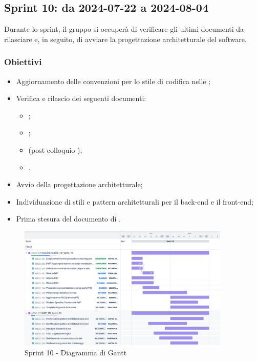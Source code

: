 \subsection{Sprint 10: da 2024-07-22 a 2024-08-04}
\par Durante lo sprint, il gruppo si occuperà di verificare gli ultimi documenti da rilasciare e, in seguito, di avviare la progettazione architetturale del software.

\subsubsection{Obiettivi}
\begin{itemize}
  \item Aggiornamento delle convenzioni per lo stile di codifica nelle \NdP;
  \item Verifica e rilascio dei seguenti documenti:
  \begin{itemize}
    \item \NdP;
    \item \PdP;
    \item \AdR{} (post colloquio \RTB);
    \item \PdQ.
  \end{itemize}
  \item Avvio della progettazione architetturale;
  \item Individuazione di stili e pattern architetturali per il back-end e il front-end;
  \item Prima stesura del documento di \ST{}.
\end{itemize}

\begin{figure}[H]
  \centering
  \includegraphics[width=0.90\textwidth]{assets/Pianificazione/Sprint-10/gantt.png}
  \caption{Sprint 10 - Diagramma di Gantt}\label{fig:sprint-10-gantt}
\end{figure}

